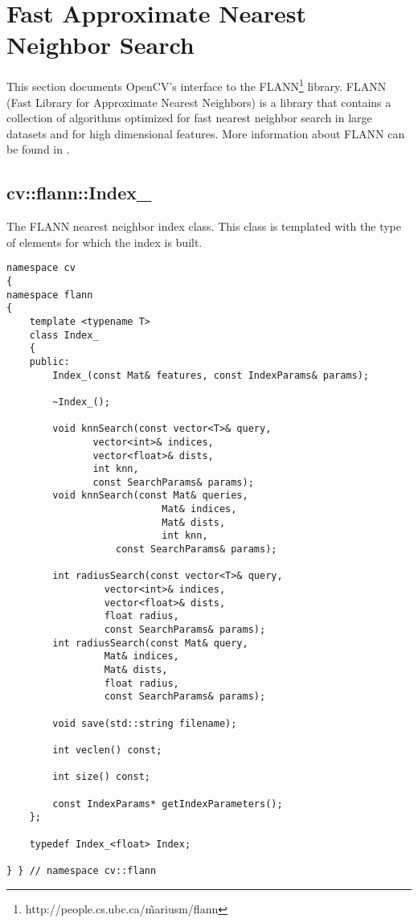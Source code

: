 \section{Fast Approximate Nearest Neighbor Search}

\ifCpp

This section documents OpenCV's interface to the FLANN\footnote{http://people.cs.ubc.ca/\~mariusm/flann} library. FLANN (Fast Library for Approximate Nearest Neighbors) is a library that
contains a collection of algorithms optimized for fast nearest neighbor search in large datasets and for high dimensional features. More 
information about FLANN can be found in \cite{muja_flann_2009}.

\ifplastex
{}
\else
\subsection{cv::flann::Index\_}\label{cvflann.Index}
\fi
The FLANN nearest neighbor index class. This class is templated with the type of elements for which the index is built.

\begin{lstlisting}
namespace cv
{
namespace flann
{
    template <typename T>
    class Index_ 
    {
    public:
	    Index_(const Mat& features, const IndexParams& params);

	    ~Index_();

	    void knnSearch(const vector<T>& query, 
			   vector<int>& indices, 
			   vector<float>& dists, 
			   int knn, 
			   const SearchParams& params);
	    void knnSearch(const Mat& queries, 
                           Mat& indices, 
                           Mat& dists, 
                           int knn, 
		           const SearchParams& params);

	    int radiusSearch(const vector<T>& query, 
			     vector<int>& indices, 
			     vector<float>& dists, 
			     float radius, 
			     const SearchParams& params);
	    int radiusSearch(const Mat& query, 
			     Mat& indices, 
			     Mat& dists, 
			     float radius, 
			     const SearchParams& params);

	    void save(std::string filename);

	    int veclen() const;

	    int size() const;

	    const IndexParams* getIndexParameters();
    };

    typedef Index_<float> Index;

} } // namespace cv::flann
\end{lstlisting}

